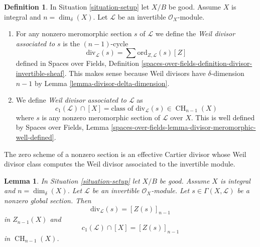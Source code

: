 \documentclass{stacks-project}
\theoremstyle{plain}
\newtheorem{lemma}[subsection]{Lemma}
\theoremstyle{definition}
\newtheorem{definition}[subsection]{Definition}
\theoremstyle{remark}
\numberwithin{equation}{subsection}
\def\CH{\mathop{\mathrm{CH}}\nolimits}
\begin{document}
\begin{definition}
\label{definition-divisor-invertible-sheaf}
In Situation \ref{situation-setup} let $X/B$ be good.
Assume $X$ is integral and $n = \dim_\delta(X)$.
Let $\mathcal{L}$ be an invertible $\mathcal{O}_X$-module.
\begin{enumerate}
\item For any nonzero meromorphic section $s$ of $\mathcal{L}$
we define the {\it Weil divisor associated to $s$} is the
$(n - 1)$-cycle
$$
\text{div}_\mathcal{L}(s) =
\sum \text{ord}_{Z, \mathcal{L}}(s) [Z]
$$
defined in Spaces over Fields, Definition
\ref{spaces-over-fields-definition-divisor-invertible-sheaf}.
This makes sense because Weil divisors have $\delta$-dimension $n - 1$
by Lemma \ref{lemma-divisor-delta-dimension}.
\item We define {\it Weil divisor associated to $\mathcal{L}$} as
$$
c_1(\mathcal{L}) \cap [X] =
\text{class of }\text{div}_\mathcal{L}(s) \in \CH_{n - 1}(X)
$$
where $s$ is any nonzero meromorphic section of $\mathcal{L}$ over
$X$. This is well defined by
Spaces over Fields, Lemma
\ref{spaces-over-fields-lemma-divisor-meromorphic-well-defined}.
\end{enumerate}
\end{definition}

\noindent
The zero scheme of a nonzero section is an effective Cartier divisor
whose Weil divisor class computes the Weil divisor associated to
the invertible module.

\begin{lemma}
\label{lemma-compute-c1}
In Situation \ref{situation-setup} let $X/B$ be good.
Assume $X$ is integral and $n = \dim_\delta(X)$.
Let $\mathcal{L}$ be an invertible $\mathcal{O}_X$-module.
Let $s \in \Gamma(X, \mathcal{L})$ be a nonzero global section.
Then
$$
\text{div}_\mathcal{L}(s) = [Z(s)]_{n - 1}
$$
in $Z_{n - 1}(X)$ and
$$
c_1(\mathcal{L}) \cap [X] = [Z(s)]_{n - 1}
$$
in $\CH_{n - 1}(X)$.
\end{lemma}
\end{document}
